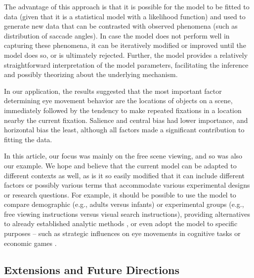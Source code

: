 \documentclass{article}
\begin{document}
The advantage of this approach is that it is possible for the model to be fitted to data (given that it is a statistical model with a likelihood function) and used to generate new data that can be contrasted with observed phenomena (such as distribution of saccade angles). In case the model does not perform well in capturing these phenomena, it can be iteratively modified or improved until the model does so, or is ultimately rejected. Further, the model provides a relatively straightforward interpretation of the model parameters, facilitating the inference and possibly theorizing about the underlying mechanism. 

In our application, the results suggested that the most important factor determining eye movement behavior are the locations of objects on a scene, immediately followed by the tendency to make repeated fixations in a location nearby the current fixation. Salience and central bias had lower importance, and horizontal bias the least, although all factors made a significant contribution to fitting the data. 

In this article, our focus was mainly on the free scene viewing, and so was also our example. We hope and believe that the current model can be adapted to different contexts as well, as is it so easily modified that it can include different factors or possibly various terms that accommodate various experimental designs or research questions. For example, it should be possible to use the model to compare demographic (e.g., adults versus infants) or experimental groups (e.g., free viewing instructions versus visual search instructions), providing alternatives to already established analytic methods \citep[e.g.,][]{coutrot2018scanpath}, or even adopt the model to specific purposes -- such as strategic influences on eye movements in cognitive tasks \citep[e.g.,][]{kucharsky2020cognitive} or economic games \citep[e.g.,][]{polonio2015strategic}.

\subsection{Extensions and Future Directions}
\end{document}
